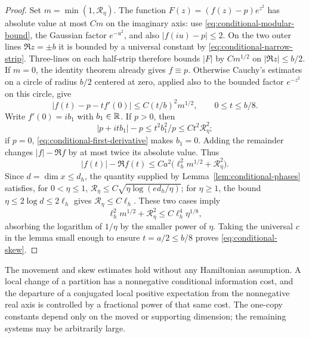 \begin{proof}
Set $m=\min(1,\mathcal R_\eta)$.  The function
$F(z)=(f(z)-p)e^{z^2}$ has absolute value at most $Cm$ on the
imaginary axis: use \eqref{eq:conditional-modular-bound}, the
Gaussian factor $e^{-u^2}$, and also $|f(iu)-p|\le2$.
On the two outer lines $\Re z=\pm b$ it is bounded by a
universal constant by \eqref{eq:conditional-narrow-strip}.
Three-lines on each half-strip therefore bounds $|F|$ by
$Cm^{1/2}$ on $|\Re z|\le b/2$.  If $m=0$, the identity theorem
already gives $f\equiv p$.  Otherwise Cauchy's estimates on a
circle of radius $b/2$ centered at zero, applied also to the
bounded factor $e^{-z^2}$ on this circle, give
\[
 |f(t)-p-tf'(0)|\le C(t/b)^2m^{1/2},\qquad 0\le t\le b/8.
\]
Write $f'(0)=ib_1$ with $b_1\in\mathbb R$.  If $p>0$, then
\[
 |p+itb_1|-p\le t^2b_1^2/p\le C t^2\mathcal R_\eta^2;
\]
if $p=0$, \eqref{eq:conditional-first-derivative} makes $b_1=0$.
Adding the remainder changes $|f|-\Re f$ by at most twice its
absolute value.  Thus
\[
 |f(t)|-\Re f(t)
 \le C a^2\big(\ell_h^2m^{1/2}+\mathcal R_\eta^2\big).
\]
Since $d=\dim x\le d_h$, the quantity supplied by
Lemma~\ref{lem:conditional-phases} satisfies, for $0<\eta\le1$,
$\mathcal R_\eta\le C\sqrt{\eta\log(ed_h/\eta)}$;
for $\eta\ge1$, the bound $\eta\le2\log d\le2\ell_h$ gives
$\mathcal R_\eta\le C\ell_h$.  These two cases imply
\[
 \ell_h^2m^{1/2}+\mathcal R_\eta^2
 \le C\ell_h^4\eta^{1/8},
\]
absorbing the logarithm of $1/\eta$ by the smaller power of
$\eta$.  Taking the universal $c$ in the lemma small enough to
ensure $t=a/2\le b/8$ proves \eqref{eq:conditional-skew}.
\end{proof}

The movement and skew estimates hold without any Hamiltonian
assumption.  A local change of a partition has a nonnegative
conditional information cost, and the departure of a conjugated local
positive expectation from the nonnegative real axis is controlled by
a fractional power of that same cost.  The one-copy constants depend
only on the moved or supporting dimension; the remaining systems may
be arbitrarily large.
